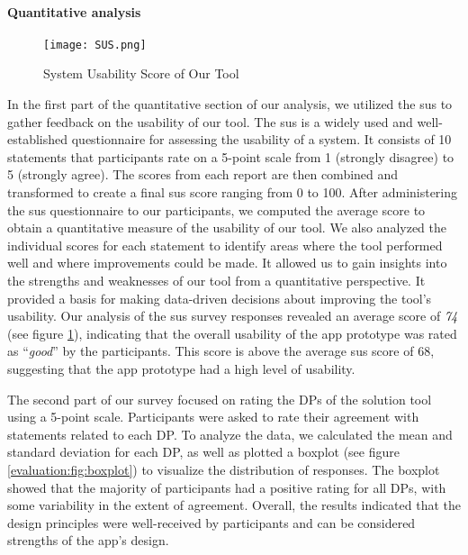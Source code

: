 \paragraph{Quantitative analysis}
\begin{figure}[ht]
    \centering
    \texttt{[image: SUS.png]}
    \caption{System Usability Score of Our Tool}
    \label{evaluation:fig:sus}
\end{figure}
In the first part of the quantitative section of our analysis, we utilized the \ac{sus} to gather feedback on the usability of our tool. 
The \ac{sus} is a widely used and well-established questionnaire for assessing the usability of a system. 
It consists of 10 statements that participants rate on a 5-point scale from 1 (strongly disagree) to 5 (strongly agree). 
The scores from each report are then combined and transformed to create a final \ac{sus} score ranging from 0 to 100.
After administering the \ac{sus} questionnaire to our participants, we computed the average score to obtain a quantitative measure of the usability of our tool. 
We also analyzed the individual scores for each statement to identify areas where the tool performed well and where improvements could be made. 
It allowed us to gain insights into the strengths and weaknesses of our tool from a quantitative perspective. 
It provided a basis for making data-driven decisions about improving the tool's usability. 
Our analysis of the \ac{sus} survey responses revealed an average score of \textit{74} (see figure \ref{evaluation:fig:sus}), indicating that the overall usability of the app prototype was rated as ``\textit{good}'' by the participants.
This score is above the average \ac{sus} score of 68, suggesting that the app prototype had a high level of usability.

The second part of our survey focused on rating the DPs of the solution tool using a 5-point scale. 
Participants were asked to rate their agreement with statements related to each DP. 
To analyze the data, we calculated the mean and standard deviation for each DP, as well as plotted a boxplot (see figure \ref{evaluation:fig:boxplot}) to visualize the distribution of responses. 
The boxplot showed that the majority of participants had a positive rating for all DPs, with some variability in the extent of agreement. 
Overall, the results indicated that the design principles were well-received by participants and can be considered strengths of the app's design.


